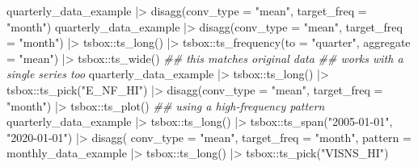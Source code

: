 \documentclass[
  letterpaper,
  DIV=11,
  numbers=noendperiod]{scrreport}
\newenvironment{Shaded}{\begin{snugshade}}{\end{snugshade}}
\newcommand{\AttributeTok}[1]{\textcolor[rgb]{0.40,0.45,0.13}{#1}}
\newcommand{\DocumentationTok}[1]{\textcolor[rgb]{0.37,0.37,0.37}{\textit{#1}}}
\newcommand{\FunctionTok}[1]{\textcolor[rgb]{0.28,0.35,0.67}{#1}}
\newcommand{\NormalTok}[1]{\textcolor[rgb]{0.00,0.23,0.31}{#1}}
\newcommand{\SpecialCharTok}[1]{\textcolor[rgb]{0.37,0.37,0.37}{#1}}
\newcommand{\StringTok}[1]{\textcolor[rgb]{0.13,0.47,0.30}{#1}}
\begin{document}
\begin{Shaded}
\begin{Highlighting}[]
\NormalTok{quarterly\_data\_example }\SpecialCharTok{|\textgreater{}}
  \FunctionTok{disagg}\NormalTok{(}\AttributeTok{conv\_type =} \StringTok{"mean"}\NormalTok{, }\AttributeTok{target\_freq =} \StringTok{"month"}\NormalTok{)}
\NormalTok{quarterly\_data\_example }\SpecialCharTok{|\textgreater{}}
  \FunctionTok{disagg}\NormalTok{(}\AttributeTok{conv\_type =} \StringTok{"mean"}\NormalTok{, }\AttributeTok{target\_freq =} \StringTok{"month"}\NormalTok{) }\SpecialCharTok{|\textgreater{}}
\NormalTok{  tsbox}\SpecialCharTok{::}\FunctionTok{ts\_long}\NormalTok{() }\SpecialCharTok{|\textgreater{}}
\NormalTok{  tsbox}\SpecialCharTok{::}\FunctionTok{ts\_frequency}\NormalTok{(}\AttributeTok{to =} \StringTok{"quarter"}\NormalTok{, }\AttributeTok{aggregate =} \StringTok{"mean"}\NormalTok{) }\SpecialCharTok{|\textgreater{}}
\NormalTok{  tsbox}\SpecialCharTok{::}\FunctionTok{ts\_wide}\NormalTok{() }\DocumentationTok{\#\# this matches original data}
\DocumentationTok{\#\# works with a single series too}
\NormalTok{quarterly\_data\_example }\SpecialCharTok{|\textgreater{}}
\NormalTok{  tsbox}\SpecialCharTok{::}\FunctionTok{ts\_long}\NormalTok{() }\SpecialCharTok{|\textgreater{}}
\NormalTok{  tsbox}\SpecialCharTok{::}\FunctionTok{ts\_pick}\NormalTok{(}\StringTok{"E\_NF\_HI"}\NormalTok{) }\SpecialCharTok{|\textgreater{}}
  \FunctionTok{disagg}\NormalTok{(}\AttributeTok{conv\_type =} \StringTok{"mean"}\NormalTok{, }\AttributeTok{target\_freq =} \StringTok{"month"}\NormalTok{) }\SpecialCharTok{|\textgreater{}}
\NormalTok{  tsbox}\SpecialCharTok{::}\FunctionTok{ts\_plot}\NormalTok{()}
\DocumentationTok{\#\# using a high{-}frequency pattern}
\NormalTok{quarterly\_data\_example }\SpecialCharTok{|\textgreater{}}
\NormalTok{  tsbox}\SpecialCharTok{::}\FunctionTok{ts\_long}\NormalTok{() }\SpecialCharTok{|\textgreater{}}
\NormalTok{  tsbox}\SpecialCharTok{::}\FunctionTok{ts\_span}\NormalTok{(}\StringTok{"2005{-}01{-}01"}\NormalTok{, }\StringTok{"2020{-}01{-}01"}\NormalTok{) }\SpecialCharTok{|\textgreater{}}
  \FunctionTok{disagg}\NormalTok{(}
    \AttributeTok{conv\_type =} \StringTok{"mean"}\NormalTok{, }\AttributeTok{target\_freq =} \StringTok{"month"}\NormalTok{, }\AttributeTok{pattern =}\NormalTok{ monthly\_data\_example }\SpecialCharTok{|\textgreater{}}
\NormalTok{      tsbox}\SpecialCharTok{::}\FunctionTok{ts\_long}\NormalTok{() }\SpecialCharTok{|\textgreater{}}
\NormalTok{      tsbox}\SpecialCharTok{::}\FunctionTok{ts\_pick}\NormalTok{(}\StringTok{"VISNS\_HI"}\NormalTok{)}

\end{Highlighting}
\end{Shaded}
\end{document}
